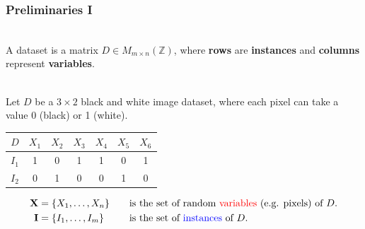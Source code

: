 \documentclass[usenames,dvipsnames]{beamer}
\newcommand{\mbf}[1]{\mathbf{#1}}
\begin{document}
\begin{frame}
  \frametitle{Preliminaries I}

  \begin{definition}[Dataset]~\\
    A dataset is a matrix $D\in M_{m\times n}(\mathbb{Z})$, where {\color{blue}\textbf{rows}} are
    {\color{blue}\textbf{instances}} and {\color{red}\textbf{columns}} represent
    {\color{red}\textbf{variables}}.
  \end{definition}

  \begin{example}~\\
    Let $D$ be a $3\times 2$ black and white image dataset, where each pixel can take a value 0
    (black) or 1 (white).

    \begin{table}
      \begin{tabular}{c|cccccc}
        $D$ & \color{red}$X_1$ & \color{red}$X_2$ & \color{red}$X_3$ & \color{red}$X_4$ &
        \color{red}$X_5$ & \color{red}$X_6$\\
        \hline
        \color{blue}$I_1$ & 1 & 0 & 1 & 1 & 0 & 1\\
        \color{blue}$I_2$ & 0 & 1 & 0 & 0 & 1 & 0\\
      \end{tabular}
    \end{table}\vspace{-0.5cm}
    \begin{align*}
      \mbf{X}&=\{X_1,\ldots,X_n\}\quad&\text{is}&\text{ the set of random {\color{red}variables}
      (e.g.  pixels) of $D$.}\\
      \mbf{I}&=\{I_1,\ldots,I_m\}\quad&\text{is}&\text{ the set of {\color{blue}instances} of $D$.}
    \end{align*}
  \end{example}

\end{frame}
\end{document}
